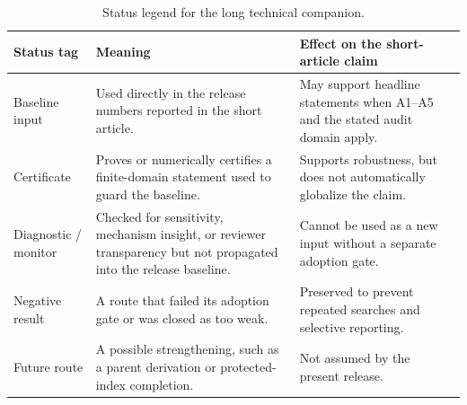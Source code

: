 \documentclass[11pt,a4paper]{article}
\begin{document}
\begin{table}[htbp]
\centering
\caption{Status legend for the long technical companion.}
\label{tab:supplement_status_legend}
\small
\setlength{\tabcolsep}{4pt}
\renewcommand{\arraystretch}{1.12}
\begin{tabular}{@{}l l l@{}}
\toprule
\parbox[t]{0.21\textwidth}{\raggedright \textbf{Status tag}} & \parbox[t]{0.34\textwidth}{\raggedright \textbf{Meaning}} & \parbox[t]{0.33\textwidth}{\raggedright \textbf{Effect on the short-article claim}} \\
\midrule
\parbox[t]{0.21\textwidth}{\raggedright Baseline input} &
\parbox[t]{0.34\textwidth}{\raggedright Used directly in the release numbers reported in the short article.} &
\parbox[t]{0.33\textwidth}{\raggedright May support headline statements when A1--A5 and the stated audit domain apply.} \\
\parbox[t]{0.21\textwidth}{\raggedright Certificate} &
\parbox[t]{0.34\textwidth}{\raggedright Proves or numerically certifies a finite-domain statement used to guard the baseline.} &
\parbox[t]{0.33\textwidth}{\raggedright Supports robustness, but does not automatically globalize the claim.} \\
\parbox[t]{0.21\textwidth}{\raggedright Diagnostic / monitor} &
\parbox[t]{0.34\textwidth}{\raggedright Checked for sensitivity, mechanism insight, or reviewer transparency but not propagated into the release baseline.} &
\parbox[t]{0.33\textwidth}{\raggedright Cannot be used as a new input without a separate adoption gate.} \\
\parbox[t]{0.21\textwidth}{\raggedright Negative result} &
\parbox[t]{0.34\textwidth}{\raggedright A route that failed its adoption gate or was closed as too weak.} &
\parbox[t]{0.33\textwidth}{\raggedright Preserved to prevent repeated searches and selective reporting.} \\
\parbox[t]{0.21\textwidth}{\raggedright Future route} &
\parbox[t]{0.34\textwidth}{\raggedright A possible strengthening, such as a parent derivation or protected-index completion.} &
\parbox[t]{0.33\textwidth}{\raggedright Not assumed by the present release.} \\
\bottomrule
\end{tabular}
\end{table}
\clearpage
\end{document}

